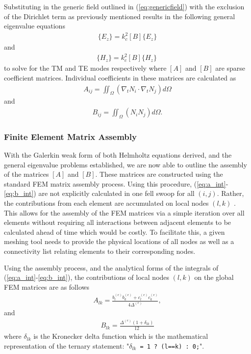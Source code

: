 Substituting in the generic field outlined in (\ref{eq:genericfield}) with the exclusion of the Dirichlet term as previously mentioned results in the following general eigenvalue equations
\begin{align}
	[A]\{E_z\}=k^2_c[B]\{E_z\}
	\label{eq:tm_eig}
\end{align}
and
\begin{align}
	[A]\{H_z\}=k^2_c[B]\{H_z\}\
	\label{eq:te_eig}
\end{align}
to solve for the TM and TE modes respectively where $[A]$ and $[B]$ are sparse coefficient matrices. Individual coefficients in these matrices are calculated as
\begin{align}
	A_{ij}=\iint_\Omega\left(\nabla_tN_i\cdot\nabla_tN_j\right)d\Omega
	\label{eq:a_int}
\end{align}
and
\begin{align}
	B_{ij}=\iint_\Omega\left(N_i N_j\right)d\Omega.
	\label{eq:b_int}
\end{align}

\subsubsection{Finite Element Matrix Assembly}
\label{subsub:mat_assembly}
With the Galerkin weak form of both Helmholtz equations derived, and the general eigenvalue problems established, we are now able to outline the assembly of the matrices $[A]$ and $[B]$. These matrices are constructed using the standard FEM matrix assembly process. Using this procedure, (\ref{eq:a_int}-\ref{eq:b_int}) are not explicitly calculated in one fell swoop for all $(i,j)$. Rather, the contributions from each element are accumulated on local nodes $(l,k)$ \cite{jin2011theory}. This allows for the assembly of the FEM matrices via a simple iteration over all elements without requiring all interactions between adjacent elements to be calculated ahead of time which would be costly. To facilitate this, a given meshing tool needs to provide the physical locations of all nodes as well as a connectivity list relating elements to their corresponding nodes.

Using the assembly process, and the analytical forms of the integrals of (\ref{eq:a_int}-\ref{eq:b_int}), the contributions of local nodes $(l,k)$ on the global FEM matrices are as follows
\begin{align}
	A_{lk}=\frac{b_l^{(e)}b_k^{(e)}+c_l^{(e)}c_k^{(e)}}{4\Delta^{(e)}},
	\label{eq:a_fin}
\end{align}
and
\begin{align}
	B_{lk}=\frac{\Delta^{(e)}(1+\delta_{lk})}{12}
	\label{eq:b_fin}
\end{align}
where $\delta_{lk}$ is the Kronecker delta function which is the mathematical representation of the ternary statement: "$\delta_{lk} $\verb| = 1 ? (l==k) : 0;|".


